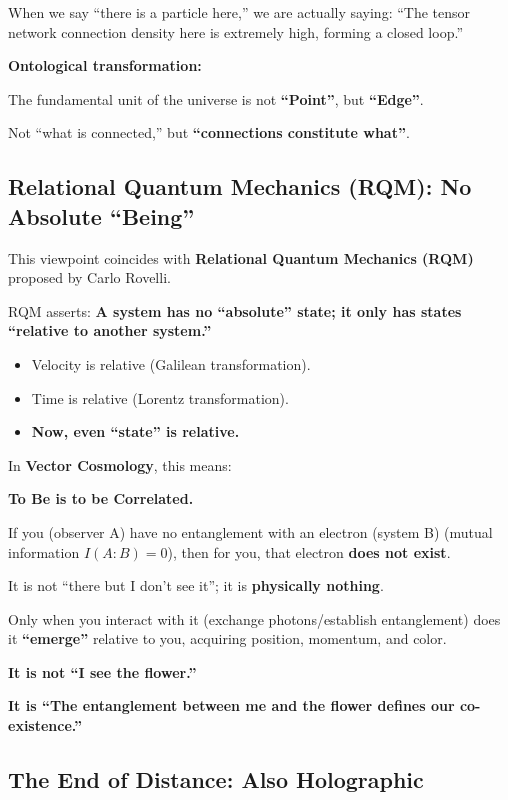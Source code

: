 When we say ``there is a particle here,'' we are actually saying: ``The tensor network connection density here is extremely high, forming a closed loop.''

\textbf{Ontological transformation:}

The fundamental unit of the universe is not \textbf{``Point''}, but \textbf{``Edge''}.

Not ``what is connected,'' but \textbf{``connections constitute what''}.

\subsection{Relational Quantum Mechanics (RQM): No Absolute ``Being''}

This viewpoint coincides with \textbf{Relational Quantum Mechanics (RQM)} proposed by Carlo Rovelli.

RQM asserts: \textbf{A system has no ``absolute'' state; it only has states ``relative to another system.''}

\begin{itemize}
\item Velocity is relative (Galilean transformation).

\item Time is relative (Lorentz transformation).

\item \textbf{Now, even ``state'' is relative.}
\end{itemize}

In \textbf{Vector Cosmology}, this means:

\textbf{To Be is to be Correlated.}

If you (observer A) have no entanglement with an electron (system B) (mutual information $I(A:B) = 0$), then for you, that electron \textbf{does not exist}.

It is not ``there but I don't see it''; it is \textbf{physically nothing}.

Only when you interact with it (exchange photons/establish entanglement) does it \textbf{``emerge''} relative to you, acquiring position, momentum, and color.

\textbf{It is not ``I see the flower.''}

\textbf{It is ``The entanglement between me and the flower defines our co-existence.''}

\subsection{The End of Distance: Also Holographic}

